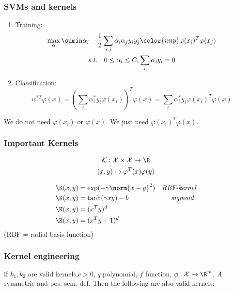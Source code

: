 \subsubsection{SVMs and kernels}
\begin{enumerate}
	\item Training: 
	\begin{equation*}
		\begin{gathered}
			\max_\alpha \sumin\alpha_i - \frac{1}{2}\sum_{i,j}\alpha_i\alpha_jy_iy_j {\color{imp} \varphi(x_i)^T\varphi(x_j)} \\
			\textit{s.t.} \quad 0\leq \alpha_i\leq C, \sum_i\alpha_i y_i = 0
		\end{gathered}
	\end{equation*}
	\item Classification:
	\begin{equation*}
		w^{*T} \varphi(x) = \left(\sum_i \alpha_i^*y_i\varphi(x_i)\right)^T\varphi(x) = \sum_i \alpha_i^*y_i\varphi(x_i)^T\varphi(x)
	\end{equation*}
\end{enumerate}

We do not need $\varphi(x_i)$ or $\varphi(x)$. We just need $\varphi(x_i)^T\varphi(x)$.


\subsubsection{Important Kernels}
\begin{equation*}
	\begin{gathered}
		\mathcal K: \mathcal X \times \mathcal X \to \R \\
		(x,y) \mapsto \varphi^T(x) \varphi(y)
	\end{gathered}
\end{equation*}

\begin{align*}
	\K(x,y) &= \exp(-\gamma\norm{x-y}^2) & \textit{RBF-kernel} \\
	\K(x,y) &= \tanh(\gamma x y ) - b & \textit{sigmoid }\\
	\K(x,y) &= (x^Ty)^d & \\
	\K(x,y) &=	(x^Ty + 1)^d & 
\end{align*}
(RBF = radial-basis function)

\subsubsection{Kernel engineering}
if $k_1, k_2$ are valid kernels,$c>0$, $q$ polynomial, $f$ function, $\phi: \mathcal X \to \R^m$, $A$ symmetric and pos. sem. def. Then the following are also valid kernels:

